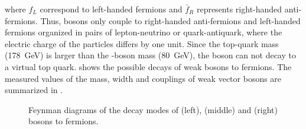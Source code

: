 where $f_{L}$ correspond to left-handed fermions and $\bar{f}_{R}$ represents right-handed anti-fermions. Thus, {\PW} bosons only couple to right-handed anti-fermions and left-handed fermions organized in pairs of lepton-neutrino or quark-antiquark, where the electric charge of the particles differs by one unit. Since the top-quark mass (\SI{178}{\GeV}) is larger than the \Wb-boson mass (\SI{80}{\GeV}), the \Wb boson can not decay to a virtual top quark.  shows the possible decays of weak bosons to fermions. The measured values of the mass, width and couplings of weak vector bosons are summarized in .

\begin{figure}[htbp]
  \vspace{10mm}
  \centering
  \hspace*{1cm}
  \hspace*{1cm}
  \vspace{4mm}
  \caption{Feynman diagrams of the decay modes of \Wp (left), \Wm (middle) and \Z (right) bosons to fermions.}
  \label{dia:WDecays}
\end{figure}

